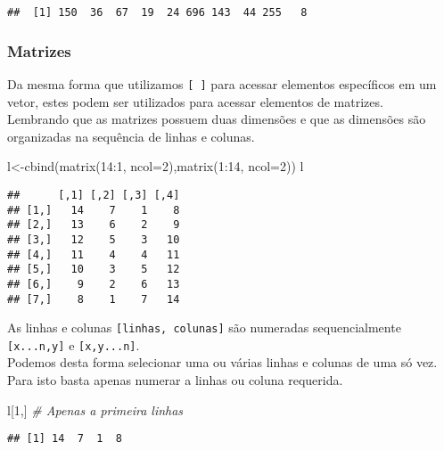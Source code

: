 \documentclass[
]{book}
\newenvironment{Shaded}{\begin{snugshade}}{\end{snugshade}}
\newcommand{\AttributeTok}[1]{\textcolor[rgb]{0.77,0.63,0.00}{#1}}
\newcommand{\CommentTok}[1]{\textcolor[rgb]{0.56,0.35,0.01}{\textit{#1}}}
\newcommand{\DecValTok}[1]{\textcolor[rgb]{0.00,0.00,0.81}{#1}}
\newcommand{\FunctionTok}[1]{\textcolor[rgb]{0.00,0.00,0.00}{#1}}
\newcommand{\NormalTok}[1]{#1}
\newcommand{\OtherTok}[1]{\textcolor[rgb]{0.56,0.35,0.01}{#1}}
\newcommand{\SpecialCharTok}[1]{\textcolor[rgb]{0.00,0.00,0.00}{#1}}
\begin{document}
\begin{verbatim}
##  [1] 150  36  67  19  24 696 143  44 255   8
\end{verbatim}

\hypertarget{matrizes}{%
\subsubsection{Matrizes}\label{matrizes}}

Da mesma forma que utilizamos \texttt{{[}\ {]}} para acessar elementos específicos em um vetor, estes podem ser utilizados para acessar elementos de matrizes.\\
Lembrando que as matrizes possuem duas dimensões e que as dimensões são organizadas na sequência de linhas e colunas.

\begin{Shaded}
\begin{Highlighting}[]
\NormalTok{l}\OtherTok{\textless{}{-}}\FunctionTok{cbind}\NormalTok{(}\FunctionTok{matrix}\NormalTok{(}\DecValTok{14}\SpecialCharTok{:}\DecValTok{1}\NormalTok{, }\AttributeTok{ncol=}\DecValTok{2}\NormalTok{),}\FunctionTok{matrix}\NormalTok{(}\DecValTok{1}\SpecialCharTok{:}\DecValTok{14}\NormalTok{, }\AttributeTok{ncol=}\DecValTok{2}\NormalTok{))}
\NormalTok{l}
\end{Highlighting}
\end{Shaded}

\begin{verbatim}
##      [,1] [,2] [,3] [,4]
## [1,]   14    7    1    8
## [2,]   13    6    2    9
## [3,]   12    5    3   10
## [4,]   11    4    4   11
## [5,]   10    3    5   12
## [6,]    9    2    6   13
## [7,]    8    1    7   14
\end{verbatim}

As linhas e colunas \texttt{{[}linhas,\ colunas{]}} são numeradas sequencialmente \texttt{{[}x...n,y{]}} e \texttt{{[}x,y...n{]}}.\\
Podemos desta forma selecionar uma ou várias linhas e colunas de uma só vez. Para isto basta apenas numerar a linhas ou coluna requerida.

\begin{Shaded}
\begin{Highlighting}[]
\NormalTok{l[}\DecValTok{1}\NormalTok{,] }\CommentTok{\# Apenas a primeira linhas}
\end{Highlighting}
\end{Shaded}

\begin{verbatim}
## [1] 14  7  1  8
\end{verbatim}
\end{document}
